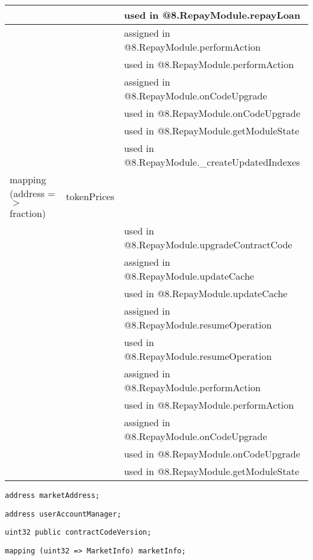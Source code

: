 \begin{tabular}{|l|l|p{5cm}|}
 & & used in @8.RepayModule.repayLoan\\\hline
 & & assigned in @8.RepayModule.performAction\\\hline
 & & used in @8.RepayModule.performAction\\\hline
 & & assigned in @8.RepayModule.onCodeUpgrade\\\hline
 & & used in @8.RepayModule.onCodeUpgrade\\\hline
 & & used in @8.RepayModule.getModuleState\\\hline
 & & used in @8.RepayModule.\_{}createUpdatedIndexes\\\hline
mapping (address =$>$ fraction) & tokenPrices &  \\\hline
 & & used in @8.RepayModule.upgradeContractCode\\\hline
 & & assigned in @8.RepayModule.updateCache\\\hline
 & & used in @8.RepayModule.updateCache\\\hline
 & & assigned in @8.RepayModule.resumeOperation\\\hline
 & & used in @8.RepayModule.resumeOperation\\\hline
 & & assigned in @8.RepayModule.performAction\\\hline
 & & used in @8.RepayModule.performAction\\\hline
 & & assigned in @8.RepayModule.onCodeUpgrade\\\hline
 & & used in @8.RepayModule.onCodeUpgrade\\\hline
 & & used in @8.RepayModule.getModuleState\\\hline
\end{tabular}
\fi


\begin{lstlisting}[firstnumber=11]
    address marketAddress;
\end{lstlisting}

\begin{lstlisting}[firstnumber=12]
    address userAccountManager;
\end{lstlisting}

\begin{lstlisting}[firstnumber=13]
    uint32 public contractCodeVersion;
\end{lstlisting}

\begin{lstlisting}[firstnumber=15]
    mapping (uint32 => MarketInfo) marketInfo;
\end{lstlisting}

